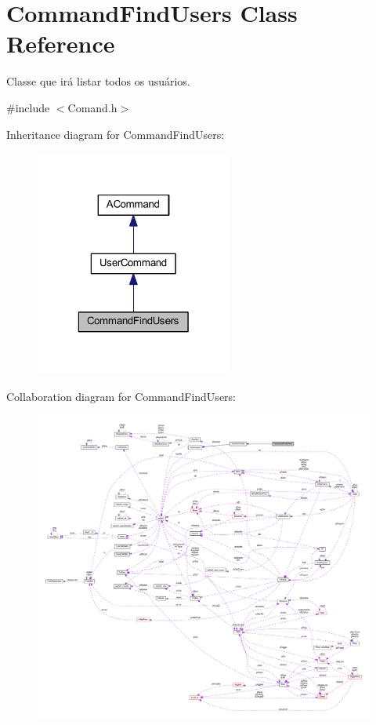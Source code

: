 \hypertarget{class_command_find_users}{\section{Command\-Find\-Users Class Reference}
\label{class_command_find_users}
}


Classe que irá listar todos os usuários.  




{\ttfamily \#include $<$Comand.\-h$>$}



Inheritance diagram for Command\-Find\-Users\-:\nopagebreak
\begin{figure}[H]
\begin{center}
\leavevmode
\includegraphics[width=184pt]{class_command_find_users__inherit__graph}
\end{center}
\end{figure}


Collaboration diagram for Command\-Find\-Users\-:\nopagebreak
\begin{figure}[H]
\begin{center}
\leavevmode
\includegraphics[width=350pt]{class_command_find_users__coll__graph}
\end{center}
\end{figure}
